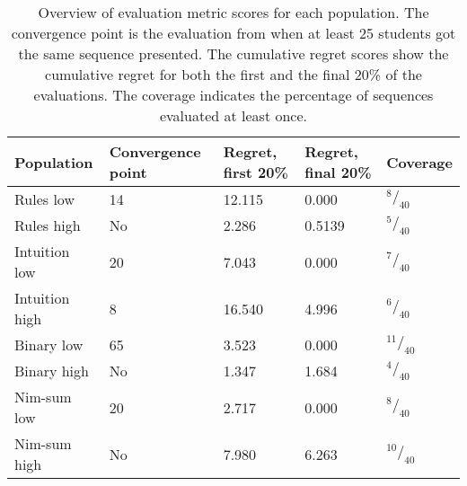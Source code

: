 \begin{table}
	\centering
	\caption[Evaluation metric scores of each population]{Overview of
	evaluation metric scores for each population. The convergence point is the
evaluation from when at least 25 students got the same sequence presented. The
cumulative regret scores show the cumulative regret for both the first and the
final 20\% of the evaluations. The coverage indicates the percentage of
sequences evaluated at least once.}
	\label{tab:pop_metrics}
	\begin{tabular}{lllll}\hline
		\textbf{Population} & \textbf{Convergence point} & \textbf{Regret,
		first 20\%} & \textbf{Regret, final 20\%} & \textbf{Coverage} \\\hline
		Rules low & 14 & 12.115 & 0.000 & $^{8}/_{40}$ \\
		Rules high & No & 2.286 & 0.5139 & $^{5}/_{40}$ \\
		Intuition low & 20 & 7.043 & 0.000 & $^{7}/_{40}$ \\
		Intuition high & 8 & 16.540 & 4.996 & $^{6}/_{40}$ \\
		Binary low & 65 & 3.523 & 0.000 & $^{11}/_{40}$ \\
		Binary high & No & 1.347 & 1.684 & $^{4}/_{40}$ \\
		Nim-sum low & 20 & 2.717 & 0.000 & $^{8}/_{40}$ \\
		Nim-sum high & No & 7.980 & 6.263 & $^{10}/_{40}$ \\
	\end{tabular}
\end{table}

